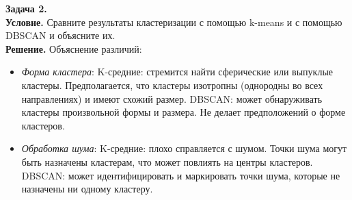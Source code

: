 \begin{minipage}{.5\textwidth}
\textbf{Задача 2.}\\
\textbf{Условие.}
  Сравните результаты кластеризации с помощью k-means и с помощью DBSCAN и объясните их.\\
\textbf{Решение.}
Объяснение различий:
\begin{itemize}
\item \textit{Форма кластера}:
K-средние: стремится найти сферические или выпуклые кластеры. Предполагается, что кластеры изотропны (однородны во всех направлениях) и имеют схожий размер.
DBSCAN: может обнаруживать кластеры произвольной формы и размера. Не делает предположений о форме кластеров.
\item \textit{Обработка шума}:
K-средние: плохо справляется с шумом. Точки шума могут быть назначены кластерам, что может повлиять на центры кластеров.
DBSCAN: может идентифицировать и маркировать точки шума, которые не назначены ни одному кластеру.
\end{itemize}
\end{minipage}%
